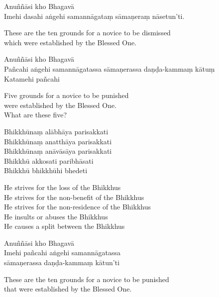 Anuññāsi kho Bhagavā\\
Imehi dasahi aṅgehi samannāgataṃ sāmaṇeraṃ nāsetun'ti.

\begin{english}
  These are the ten grounds for a novice to be dismissed\\
  which were established by the Blessed One.
\end{english}


Anuññāsi kho Bhagavā\\
Pañcahi aṅgehi samannāgatassa sāmaṇerassa daṇḍa-kammaṃ kātuṃ\\
Katamehi pañcahi

\begin{english}
  Five grounds for a novice to be punished\\
  were established by the Blessed One.\\
  What are these five?
\end{english}

Bhikkhūnaṃ alābhāya parisakkati\\
Bhikkhūnaṃ anatthāya parisakkati\\
Bhikkhūnaṃ anāvāsāya parisakkati\\
Bhikkhū akkosati paribhāsati\\
Bhikkhū bhikkhūhi bhedeti

\clearpage

\begin{english}
  He strives for the loss of the Bhikkhus\\
  He strives for the non-benefit of the Bhikkhus\\
  He strives for the non-residence of the Bhikkhus\\
  He insults or abuses the Bhikkhus\\
  He causes a split between the Bhikkhus
\end{english}

Anuññāsi kho Bhagavā\\
Imehi pañcahi aṅgehi samannāgatassa\\
sāmaṇerassa daṇḍa-kammaṃ kātun'ti

\begin{english}
  These are the ten grounds for a novice to be punished\\
  that were established by the Blessed One.
\end{english}


